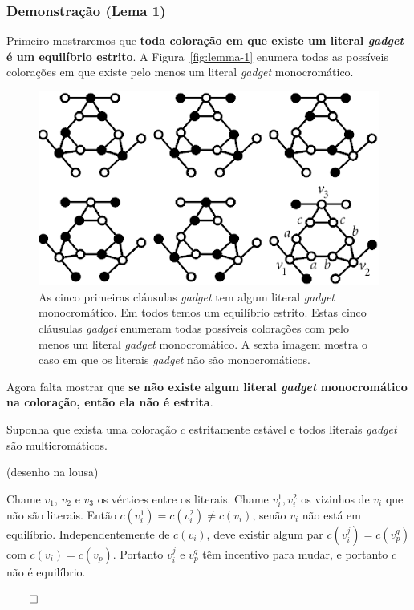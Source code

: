 \documentclass{beamer}
\theoremstyle{plain}
\newcommand{\gadget}{\textit{gadget}}
\begin{document}
\begin{frame}
  \frametitle{Demonstração (Lema 1)}

  Primeiro mostraremos que \textbf{toda coloração em que existe um literal \gadget{} é um
  equilíbrio estrito}. A Figura~\autoref{fig:lemma-1} enumera todas as possíveis colorações em que
  existe pelo menos um literal \gadget{} monocromático.

  \begin{figure}[h]
    \centering\includegraphics[scale=0.35]{imgs/lemma-1.png}
    \captionsetup{justification=raggedright}
    \caption{\label{fig:lemma-1}As cinco primeiras cláusulas \gadget{} tem algum literal \gadget{}
    monocromático. Em todos temos um equilíbrio estrito. Estas cinco cláusulas \gadget{} enumeram
    todas possíveis colorações com pelo menos um literal \gadget{} monocromático. A sexta imagem
    mostra o caso em que os literais \gadget{} não são monocromáticos.}
  \end{figure}
\end{frame}

\begin{frame}
  Agora falta mostrar que \textbf{se não existe algum literal \gadget{} monocromático na coloração,
  então ela não é estrita}.

  Suponha que exista uma coloração $c$ estritamente estável e todos literais \gadget{} são
  multicromáticos.

  {\color{gray} (desenho na lousa)}

  Chame $v_1$, $v_2$ e $v_3$ os vértices entre os literais. Chame $v_i^1,v_i^2$ os vizinhos de
  $v_i$ que não são literais. Então $c(v_i^1)=c(v_i^2)\neq c(v_i)$, senão $v_i$ não está em
  equilíbrio. Independentemente de $c(v_i)$, deve existir algum par $c(v_i^j)=c(v_p^q)$ com
  $c(v_i)=c(v_p)$. Portanto $v_i^j$ e $v_p^q$ têm incentivo para mudar, e portanto $c$ não é
  equilíbrio.

  \hfill{}$\qed$
\end{frame}
\end{document}
